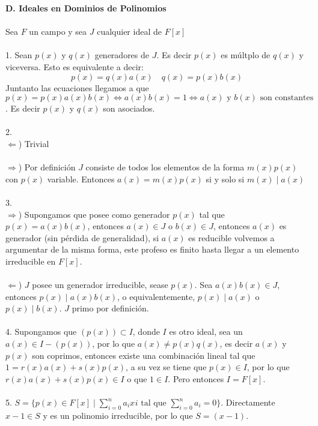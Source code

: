 \documentclass{article}
\begin{document}
\textbf{D. Ideales en Dominios de Polinomios}
\\
\\
Sea $F$ un campo y sea $J$ cualquier ideal de $F[x]$
\\
\\
1. Sean $p(x)$ y $q(x)$ generadores de $J$. Es decir $p(x)$ es múltplo de $q(x)$ y viceversa. Esto es equivalente a decir:
\begin{equation*}
    p(x)=q(x)a(x) \quad q(x)=p(x)b(x)
\end{equation*}
Juntanto las ecuaciones llegamos a que $p(x)=p(x)a(x)b(x) \Longleftrightarrow a(x)b(x)=1 \Longleftrightarrow a(x) \text{ y } b(x) \text{ son constantes}$. Es decir $p(x)$ y $q(x)$ son asociados.
\\
\\
2.
\\
$\Longleftarrow$) Trivial
\\
\\
$\Longrightarrow$) Por definición $J$ consiste de todos los elementos de la forma $m(x)p(x)$ con $p(x)$ variable. Entonces $a(x)=m(x)p(x)$ si y solo si $m(x)\mid a(x)$
\\
\\
3.
\\
$\Longrightarrow$) Supongamos que posee como generador $p(x)$ tal que $p(x)=a(x)b(x)$, entonces $a(x) \in J$ o $b(x) \in J$, entonces $a(x)$ es generador (sin pérdida de generalidad), si $a(x)$ es reducible volvemos a argumentar de la misma forma, este profeso es finito hasta llegar a un elemento irreducible en $F[x]$.
\\
\\
$\Longleftarrow$) $J$ posee un generador irreducible, sease $p(x)$. Sea $a(x)b(x) \in J$, entonces $p(x)\mid a(x)b(x)$, o equivalentemente, $p(x) \mid a(x)$ o $p(x) \mid b(x)$. $J$ primo por definición.
\\
\\
4. Supongamos que $(p(x)) \subset I$, donde $I$ es otro ideal, sea un $a(x) \in I-(p(x))$, por lo que $a(x) \neq p(x)q(x)$, es decir $a(x)$ y $p(x)$ son coprimos, entonces existe una combinación lineal tal que $1=r(x)a(x)+s(x)p(x)$, a su vez se tiene que $p(x) \in I$, por lo que $r(x)a(x)+s(x)p(x) \in I$ o que $1 \in I$. Pero entonces $I=F[x]$.
\\
\\
5. $S=\{ p(x) \in F[x] \mid \sum_{i=0}^{n}a_{i}x^{}i \text{ tal que } \sum_{i=0}^{n}a_{i}=0\}$. Directamente $x-1 \in S$ y es un polinomio irreducible, por lo que $S=(x-1)$.
\\
\end{document}
